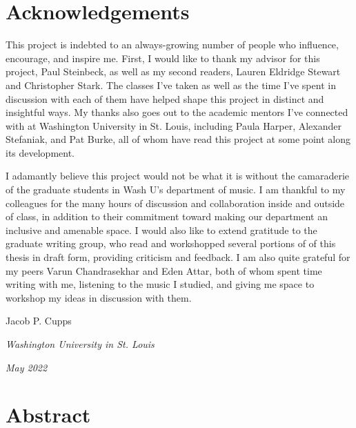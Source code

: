 \documentclass[12pt]{report}
\begin{document}
\thispagestyle{empty}

\frenchspacing

\setcounter{page}{2}
    \tableofcontents
    \listoffigures
    \listoftables

    \chapter*{Acknowledgements}

This project is indebted to an always-growing number of people who influence, encourage, and inspire me. First, I would like to thank my advisor for this project, Paul Steinbeck, as well as my second readers, Lauren Eldridge Stewart and Christopher Stark. The classes I've taken as well as the time I've spent in discussion with each of them have helped shape this project in distinct and insightful ways. My thanks also goes out to the academic mentors I've connected with at Washington University in St. Louis, including Paula Harper, Alexander Stefaniak, and Pat Burke, all of whom have read this project at some point along its development.
 
I adamantly believe this project would not be what it is without the camaraderie of the graduate students in Wash U's department of music. I am thankful to my colleagues for the many hours of discussion and collaboration inside and outside of class, in addition to their commitment toward making our department an inclusive and amenable space. I would also like to extend gratitude to the graduate writing group, who read and workshopped several portions of of this thesis in draft form, providing criticism and feedback. I am also quite grateful for my peers Varun Chandrasekhar and Eden Attar, both of whom spent time writing with me, listening to the music I studied, and giving me space to workshop my ideas in discussion with them.

\vspace{0.2cm}
\hfill{Jacob P. Cupps}

\noindent \textit{Washington University in St. Louis}

\noindent \textit{May 2022}

    \chapter*{Abstract}
    
\end{document}

